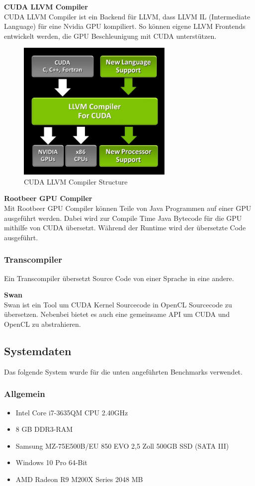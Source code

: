 \newpage

\textbf{CUDA LLVM Compiler}\\
CUDA LLVM Compiler ist ein Backend für LLVM, dass LLVM IL (Intermediate Language) für eine Nvidia GPU kompiliert. So können eigene LLVM Frontends entwickelt werden, die GPU Beschleunigung mit CUDA unterstützen.

\begin{figure}[!h]
	\begin{center}
		\includegraphics[width=7.5cm]{images/LLVM_Compiler_structure.jpg}
		\caption{CUDA LLVM Compiler Structure\cite{cudallvm}}
	\end{center}
\end{figure}

\textbf{Rootbeer GPU Compiler}\\
Mit Rootbeer GPU Compiler können Teile von Java Programmen auf einer GPU ausgeführt werden. Dabei wird zur Compile Time Java Bytecode für die GPU mithilfe von CUDA übersetzt. Während der Runtime wird der übersetzte Code ausgeführt.\cite{rootbeer1}

\subsubsection{Transcompiler}
Ein Transcompiler übersetzt Source Code von einer Sprache in eine andere.

\textbf{Swan}\\
Swan ist ein Tool um CUDA Kernel Sourcecode in OpenCL Sourcecode zu übersetzen. Nebenbei bietet es auch eine gemeinsame API um CUDA und OpenCL zu abstrahieren.\cite{swan}
\newpage
\subsection{Systemdaten}
Das folgende System wurde für die unten angeführten Benchmarks verwendet.
\subsubsection{Allgemein}
\begin{itemize}
\item Intel Core i7-3635QM CPU 2.40GHz
\item 8 GB DDR3-RAM
\item Samsung MZ-75E500B/EU 850 EVO 2,5 Zoll 500GB SSD (SATA III)
\item Windows 10 Pro 64-Bit
\item AMD Radeon R9 M200X Series 2048 MB

\end{itemize}
